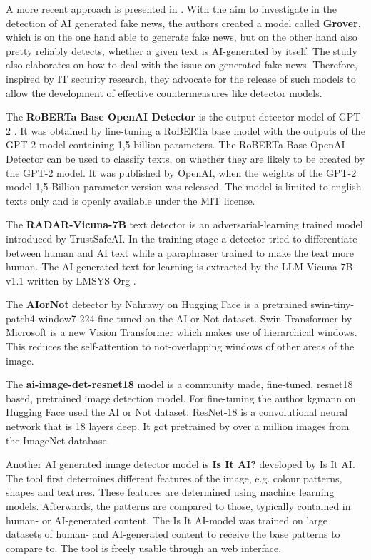 \documentclass{article} %
\begin{document}
A more recent approach is presented in \cite{zellers2020defending}. With the aim to investigate in the detection of AI generated fake news, the authors created a model called \textbf{Grover}, which is on the one hand able to generate fake news, but on the other hand also pretty reliably detects, whether a given text is AI-generated by itself. The study also elaborates on how to deal with the issue on generated fake news. Therefore, inspired by IT security research, they advocate for the release of such models to allow the development of effective countermeasures like detector models.

The \textbf{RoBERTa Base OpenAI Detector} is the output detector model of GPT-2 \cite{solaiman2019release}. It was obtained by fine-tuning a RoBERTa base model with the outputs of the GPT-2 model containing 1,5 billion parameters. The RoBERTa Base OpenAI Detector can be used to classify texts, on whether they are likely to be created by the GPT-2 model. It was published by OpenAI, when the weights of the GPT-2 model 1,5 Billion parameter version was released. The model is limited to english texts only and is openly available under the MIT license.

The \textbf{RADAR-Vicuna-7B} text detector is an adversarial-learning trained model introduced by TrustSafeAI. In the training stage a detector tried to differentiate between human and AI text while a paraphraser trained to make the text more human. The AI-generated text for learning is extracted by the LLM Vicuna-7B-v1.1 written by LMSYS Org \cite{hu2023radar}.

The \textbf{AIorNot} detector by Nahrawy on Hugging Face is a pretrained swin-tiny-patch4-window7-224 fine-tuned on the AI or Not dataset. Swin-Transformer by Microsoft is a new Vision Transformer which makes use of hierarchical windows. This reduces the self-attention to not-overlapping windows of other areas of the image. \cite{liu2021swin}

The \textbf{ai-image-det-resnet18} model is a community made, fine-tuned, resnet18 based, pretrained image detection model. For fine-tuning the author kgmann on Hugging Face used the AI or Not dataset. ResNet-18 is a convolutional neural network that is 18 layers deep. It got pretrained by over a million images from the ImageNet database. \cite{he2015deep}

Another AI generated image detector model is \textbf{Is It AI?} developed by Is It AI. The tool first determines different features of the image, e.g. colour patterns, shapes and textures. These features are determined using machine learning models. Afterwards, the patterns are compared to those, typically contained in human- or AI-generated content. The Is It AI-model was trained on large datasets of human- and AI-generated content to receive the base patterns to compare to. The tool is freely usable through an web interface. \cite{IsItAI2024}
\end{document}
